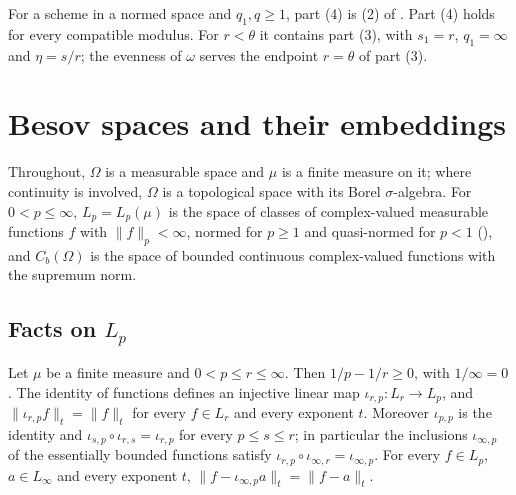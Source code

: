 For a scheme in a normed space and $q_1, q \geq 1$, part (4) is (2) of
. Part (4) holds for every compatible modulus. For
$r < \theta$ it contains part (3), with $s_1 = r$, $q_1 = \infty$ and $\eta = s/r$; the evenness
of $\omega$ serves the endpoint $r = \theta$ of part (3).

\chapter{Besov spaces and their embeddings}
\label{ch:besov}

Throughout, $\Omega$ is a measurable space and $\mu$ is a finite measure on it; where
continuity is involved, $\Omega$ is a topological space with its Borel $\sigma$-algebra. For
$0 < p \leq \infty$, $L_p = L_p(\mu)$ is the space of classes of
complex-valued measurable functions $f$ with $\|f\|_p < \infty$, normed for $p \geq 1$ and
quasi-normed for $p < 1$ (), and $C_b(\Omega)$ is the space of bounded
continuous complex-valued functions with the supremum norm.

\section{Facts on \texorpdfstring{$L_p$}{L\_p}}

\begin{lemma}
\label{lem:inclusion-linear}
\leanok
Let $\mu$ be a finite measure and $0 < p \leq r \leq \infty$. Then $1/p - 1/r \geq 0$, with
$1/\infty = 0$. The identity of functions defines an injective linear map
$\iota_{r,p} : L_r \to L_p$, and $\|\iota_{r,p} f\|_t = \|f\|_t$ for every $f \in L_r$ and every
exponent $t$. Moreover $\iota_{p,p}$ is the identity and
$\iota_{s,p} \circ \iota_{r,s} = \iota_{r,p}$ for every $p \leq s \leq r$; in particular the
inclusions $\iota_{\infty,p}$ of the essentially bounded functions satisfy
$\iota_{r,p} \circ \iota_{\infty,r} = \iota_{\infty,p}$. For every $f \in L_p$, $a \in L_\infty$
and every exponent $t$, $\|f - \iota_{\infty,p} a\|_t = \|f - a\|_t$.
\end{lemma}

